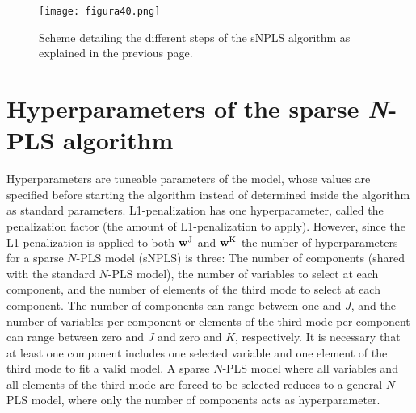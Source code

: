 \begin{figure}[hbtp]
\centering
\texttt{[image: figura40.png]}
\caption[Scheme detailing the different steps of the sNPLS algorithm]{Scheme detailing the different steps of the sNPLS algorithm as explained in the previous page. \vspace{15pt}}
\label{figura40}
\end{figure}



\section{Hyperparameters of the sparse \textit{N}-PLS algorithm}
\label{hyperparameters}
Hyperparameters are tuneable parameters of the model, whose values are specified before starting the algorithm instead of determined inside the algorithm as standard parameters. L1-penalization has one hyperparameter, called the penalization factor (the amount of L1-penalization to apply). However, since the L1-penalization is applied to both $\textbf{\text{w}}^\text{J}$ and $\textbf{\text{w}}^\text{K}$ the number of hyperparameters for a sparse $N$-PLS model (sNPLS) is three: The number of components (shared with the standard $N$-PLS model), the number of variables to select at each component, and the number of elements of the third mode to select at each component. The number of components can range between one and $J$, and the number of variables per component or elements of the third mode per component can range between zero and $J$ and zero and $K$, respectively. It is necessary that at least one component includes one selected variable and one element of the third mode to fit a valid model. A sparse $N$-PLS model where all variables and all elements of the third mode are forced to be selected reduces to a general $N$-PLS model, where only the number of components acts as hyperparameter.

